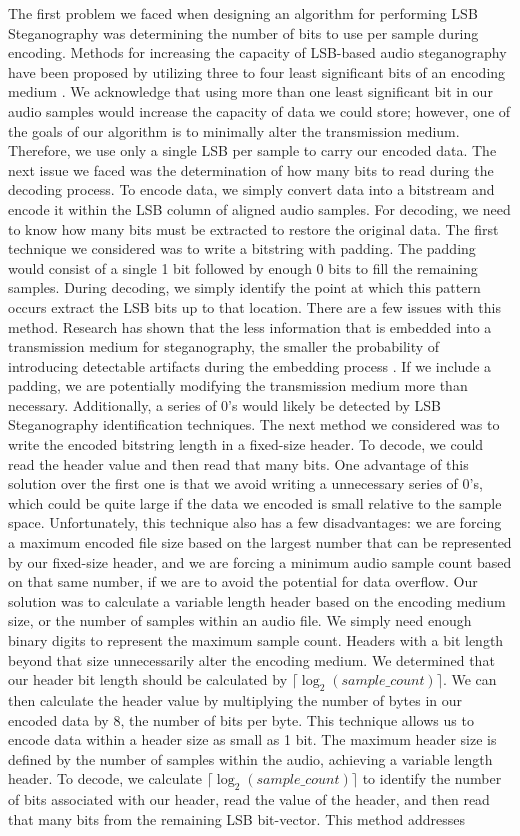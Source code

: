 The first problem we faced when designing an algorithm for performing LSB Steganography was determining the number of bits to use per sample during encoding. Methods for increasing the capacity of LSB-based audio steganography have been proposed by utilizing three to four least significant bits of an encoding medium \cite{paper4}. We acknowledge that using more than one least significant bit in our audio samples would increase the capacity of data we could store; however, one of the goals of our algorithm is to minimally alter the transmission medium. Therefore, we use only a single LSB per sample to carry our encoded data. The next issue we faced was the determination of how many bits to read during the decoding process. To encode data, we simply convert data into a bitstream and encode it within the LSB column of aligned audio samples. For decoding, we need to know how many bits must be extracted to restore the original data. The first technique we considered was to write a bitstring with padding. The padding would consist of a single 1 bit followed by enough 0 bits to fill the remaining samples. During decoding, we simply identify the point at which this pattern occurs extract the LSB bits up to that location. There are a few issues with this method. Research has shown that the less information that is embedded into a transmission medium for steganography, the smaller the probability of introducing detectable artifacts during the embedding process \cite{paper1}. If we include a padding, we are potentially modifying the transmission medium more than necessary. Additionally, a series of 0's would likely be detected by LSB Steganography identification techniques. The next method we considered was to write the encoded bitstring length in a fixed-size header. To decode, we could read the header value and then read that many bits. One advantage of this solution over the first one is that we avoid writing a unnecessary series of 0's, which could be quite large if the data we encoded is small relative to the sample space. Unfortunately, this technique also has a few disadvantages: we are forcing a maximum encoded file size based on the largest number that can be represented by our fixed-size header, and we are forcing a minimum audio sample count based on that same number, if we are to avoid the potential for data overflow. Our solution was to calculate a variable length header based on the encoding medium size, or the number of samples within an audio file. We simply need enough binary digits to represent the maximum sample count. Headers with a bit length beyond that size unnecessarily alter the encoding medium. We determined that our header bit length should be calculated by $\lceil\log_2(\textit{sample\_count})\rceil$. We can then calculate the header value by multiplying the number of bytes in our encoded data by 8, the number of bits per byte. This technique allows us to encode data within a header size as small as 1 bit. The maximum header size is defined by the number of samples within the audio, achieving a variable length header. To decode, we calculate $\lceil\log_2(\textit{sample\_count})\rceil$ to identify the number of bits associated with our header, read the value of the header, and then read that many bits from the remaining LSB bit-vector. This method addresses 